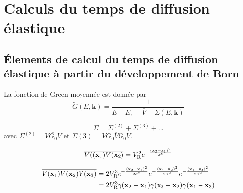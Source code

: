 \chapter{Calculs du temps de diffusion élastique}
\label{ch:anex_taus}

\section{Élements de calcul du temps de diffusion élastique à partir du développement de Born}
La fonction de Green moyennée est donnée par 
\begin{equation}
\widetilde{G}(E,\mathbf{k})=\frac{1}{E-E_{\mathrm{k}}-\overline{V}-\Sigma(E,\mathbf{k})}
\end{equation}


\begin{equation}
\Sigma=\Sigma^{(2)} + \Sigma^{(3)} + \dots
\end{equation}
avec $\Sigma^{(2)}=\overline{V G_0 V}$ et $\Sigma{(3)}=\overline{V G_0 V G_0 V}$.

\begin{equation}
\overline{V((\mathbf{x}_{\mathrm{1}})V(\mathbf{x}_{\mathrm{2}})}=V_{\mathrm{R}}^2 e^{-\frac{(\mathbf{x}_{\mathrm{2}}-\mathbf{x}_{\mathrm{1}})^2}{\sigma^2}}
\end{equation}

\begin{align}
\overline{V(\mathbf{x}_{\mathrm{1}})V(\mathbf{x}_{\mathrm{2}})V(\mathbf{x}_{\mathrm{3}})}&= 2V_{\mathrm{R}}^3 e^{-\frac{(\mathbf{x}_{\mathrm{2}}-\mathbf{x}_{\mathrm{1}})^2}{2\sigma^2}}e^{-\frac{(\mathbf{x}_{\mathrm{3}}-\mathbf{x}_{\mathrm{2}})^2}{2\sigma^2}}e^{-\frac{(\mathbf{x}_{\mathrm{1}}-\mathbf{x}_{\mathrm{3}})^2}{2\sigma^2}} \\ 
&=2V_{\mathrm{R}}^3 \gamma(\mathbf{x}_{\mathrm{2}}-\mathbf{x}_{\mathrm{1}})\gamma(\mathbf{x}_{\mathrm{3}}-\mathbf{x}_{\mathrm{2}})\gamma(\mathbf{x}_{\mathrm{1}}-\mathbf{x}_{\mathrm{3}})
\end{align}


